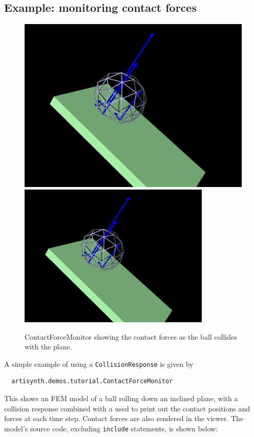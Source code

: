 \subsection{Example: monitoring contact forces}
\label{contactForceMonitor:sec}

\begin{figure}[ht]
\begin{center}
\iflatexml
 \includegraphics[]{images/ContactForceMonitor}
\else
 \includegraphics[width=3.6in]{images/ContactForceMonitor}
\fi
\end{center}
\caption {ContactForceMonitor showing the contact forces as
the ball collides with the plane.}
\label{ContactForceMonitor:fig}
\end{figure}

A simple example of using a {\tt CollisionResponse} is given by
%
\begin{verbatim}
  artisynth.demos.tutorial.ContactForceMonitor
\end{verbatim}
%
This shows an FEM model of a ball rolling down an inclined plane,
with a collision response combined with a 
used to print out the contact positions and forces at each time step.
Contact forces are also rendered in the viewer.  The model's source
code, excluding {\tt include} statements, is shown below:

